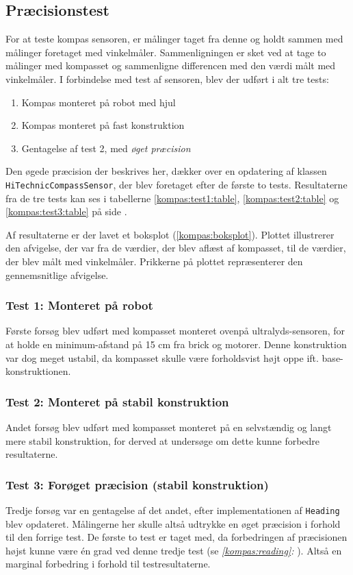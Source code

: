 \subsection{Præcisionstest}\label{kompas:precision}
For at teste kompas sensoren, er målinger taget fra denne og holdt sammen med målinger foretaget med vinkelmåler.
Sammenligningen er sket ved at tage to målinger med kompasset og sammenligne differencen med den værdi målt med vinkelmåler.
I forbindelse med test af sensoren, blev der udført i alt tre tests:
\begin{enumerate}
\item Kompas monteret på robot med hjul
\item Kompas monteret på fast konstruktion
\item Gentagelse af test 2, med \textit{øget præcision}
\end{enumerate}
Den øgede præcision der beskrives her, dækker over en opdatering af \mindsqualls klassen \lstinline[style=csharp]!HiTechnicCompassSensor!, der blev foretaget efter de første to tests.
Resultaterne fra de tre tests kan ses i tabellerne \ref{kompas:test1:table}, \ref{kompas:test2:table} og \ref{kompas:test3:table} på side \pageref{kompas:test1:table}.

Af resultaterne er der lavet et boksplot (\cref{kompas:boksplot}).
Plottet illustrerer den afvigelse, der var fra de værdier, der blev aflæst af kompasset, til de værdier, der blev målt med vinkelmåler.
Prikkerne på plottet repræsenterer den gennemsnitlige afvigelse.



\subsubsection{Test 1: Monteret på robot}
Første forsøg blev udført med kompasset monteret ovenpå ultralyds-sensoren, for at holde en minimum-afstand på 15 cm fra brick og motorer.
Denne konstruktion var dog meget ustabil, da kompasset skulle være forholdsvist højt oppe ift. base-konstruktionen.

\subsubsection{Test 2: Monteret på stabil konstruktion}
Andet forsøg blev udført med kompasset monteret på en selvstændig og langt mere stabil konstruktion, for derved at undersøge om dette kunne forbedre resultaterne.

\subsubsection{Test 3: Forøget præcision (stabil konstruktion)}
Tredje forsøg var en gentagelse af det andet, efter implementationen af \lstinline[style=csharp]!Heading! blev opdateret.
Målingerne her skulle altså udtrykke en øget præcision i forhold til den forrige test.
De første to test er taget med, da forbedringen af præcisionen højst kunne være \'en grad ved denne tredje test (se \textit{\cref{kompas:reading}: }).
Altså en marginal forbedring i forhold til testresultaterne.

